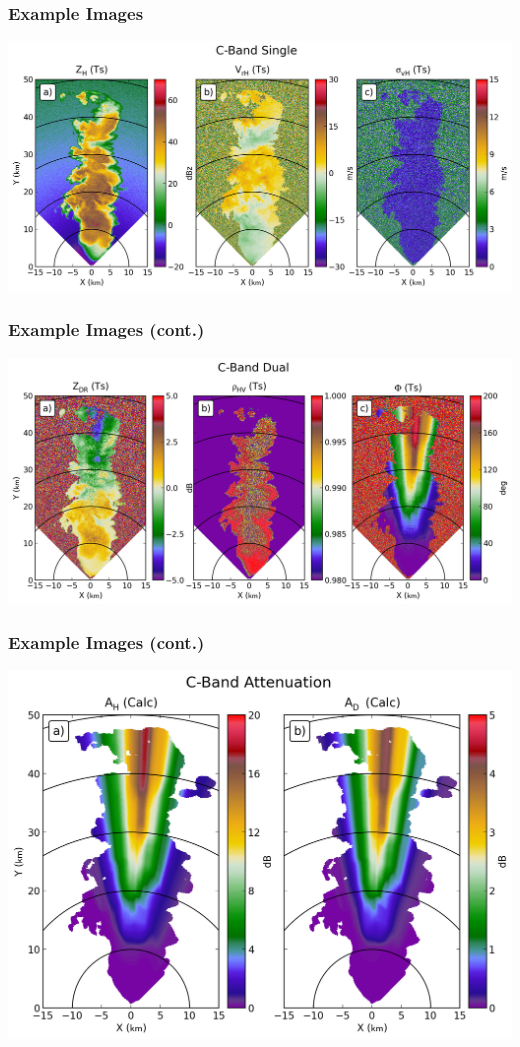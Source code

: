 \documentclass[red]{beamer}
\begin{document}
\begin{frame}
	\frametitle{Example Images}
	\includegraphics[scale=0.4]{figures/C_Single.png}
\end{frame}

\begin{frame}
	\frametitle{Example Images (cont.)}
	\includegraphics[scale=0.4]{figures/C_Dual.png}
\end{frame}

\begin{frame}
	\frametitle{Example Images (cont.)}
	\begin{center}
		\includegraphics[scale=0.4]{figures/C_Attenuation.png}
	\end{center}
\end{frame}
\end{document}
